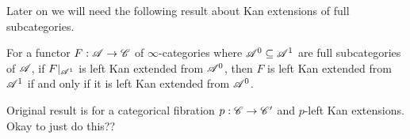 \documentclass[../../thesis.tex]{subfiles}
\begin{document}
Later on we will need the following result about Kan extensions of full subcategories.
\begin{proposition}\label{4.3.2.8}
    For a functor $F: \mathscr{A}\to\mathscr{C}$ of $\infty$-categories where $\mathscr{A}^0 \subseteq \mathscr{A}^1$ are full subcategories of $\mathscr{A}$, if $F|_{\mathscr{A}^1}$ is left Kan extended from $\mathscr{A}^0$, then $F$ is left Kan extended from $\mathscr{A}^1$ if and only if it is left Kan extended from $\mathscr{A}^0$.
\end{proposition}
\begin{remark}
    Original result is for a categorical fibration $p:\mathscr{C}\to \mathscr{C}'$ and $p$-left Kan extensions. Okay to just do this??
\end{remark}
\end{document}
